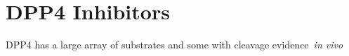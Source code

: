 \section{DPP4 Inhibitors}
DPP4 has a large array of substrates and some with cleavage evidence~\textit{in vivo} 